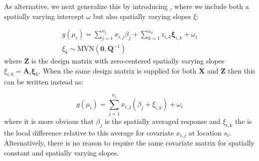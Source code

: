 As alternative, we next generalize this by introducing , where we include both a spatially varying intercept \(\omega\) but also spatially varying slopes \( \xi \):

\begin{equation}
\begin{gathered}
    g(\mu_i) = \sum_{j=1}^{n_j} x_{i,j} \beta_j + \sum_{k=1}^{n_k} z_{i,k} \mathbf \xi_{i,k} + \omega_i \\
    \xi_k \sim \mathrm {MVN}( \mathbf{0, Q}^{-1} )
\end{gathered}
\end{equation}
where \( \mathbf Z \) is the design matrix with zero-centered spatially varying slopes \( \xi_{i,k} = \mathbf A_i \mathbf \xi_k \). When the same design matrix is supplied for both \(\mathbf X\) and \(\mathbf Z\) then this can be written instead as:

\begin{equation} \label{eq:Chap8_SVC}
    g(\mu_i) = \sum_{j=1}^{n_j} x_{i,j} ( \beta_j + \xi_{i,k} ) + \omega_i
\end{equation}
where it is more obvious that \( \beta_j \) is the spatially averaged response and \( \xi_{i,k} \) the is the local difference relative to this average for covariate \(x_{i,j}\) at location \(s_i\).  Alternatively, there is no reason to require the same covariate matrix for spatially constant and spatially varying slopes. 

